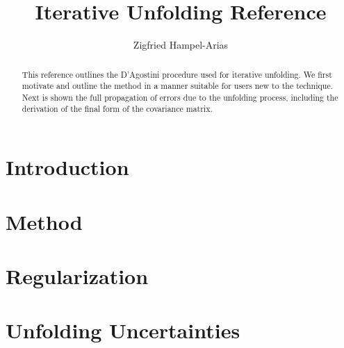 \documentclass[11pt, letter]{article}
\newcommand\blankpage{%
    \null
    \thispagestyle{empty}%
    \addtocounter{page}{-1}%
    \newpage}
\begin{document}
\titleGP
\afterpage{\blankpage}

\title{Iterative Unfolding Reference}
\author{Zigfried Hampel-Arias}
\maketitle


\begin{abstract}

This reference outlines the D'Agostini procedure used for iterative unfolding.
We first motivate and outline the method in a manner suitable for users new to the technique.
Next is shown the full propagation of errors due to the unfolding process, including the derivation
of the final form of the covariance matrix.

\end{abstract}


\tableofcontents
\newpage


\section{Introduction}
\label{introduction_section}
\newpage


\section{Method}\label{unfolding_method_section}

\newpage

\section{Regularization}\label{regularization_section}

\newpage

\section{Unfolding Uncertainties}\label{uncertainties_section}

\newpage
\end{document}
